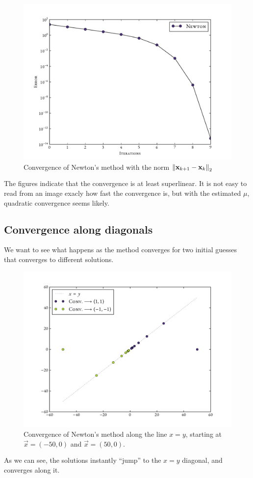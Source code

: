 \documentclass[12pt]{article}
\begin{document}
\begin{multicols*}{2}
    \begin{figure}[H]
        \centering
        \includegraphics[width=0.75\columnwidth]{diff_norms}
        \caption{
            Convergence of Newton's method with the norm
            $\Norm[2]{\vec x_{k+1} - \vec x_k }$
        }
        \label{fig:diff_norms}
    \end{figure}\noindent
    The figures indicate that the convergence is at least superlinear.
    It is not easy to read from an image exacly how fast the convergence is,
    but with the estimated $\mu$, quadratic convergence seems likely.

    \subsection*{Convergence along diagonals}
    We want to see what happens as the method converges for
    two initial guesses that converges to different solutions.
    \begin{figure}[H]
        \centering
        \includegraphics[width=0.9\columnwidth]{conv_pn}
        \caption{
            Convergence of Newton's method along the line $x = y$,
            starting at $\vec x = (-50, 0)$ and $\vec x = (50, 0)$.
        }
        \label{fig:conv_pn}
    \end{figure}\noindent
    As we can see, the solutions instantly ``jump'' to the
    $x = y$ diagonal, and converges along it.



\end{multicols*}
\end{document}
